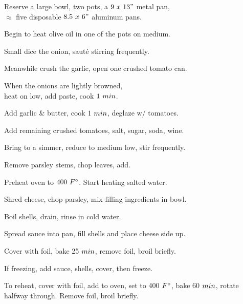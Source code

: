 \begin{preparation}
\item Reserve a large bowl, two pots, a $9~x~13"$ metal pan,\\
	$\approx$ five disposable $8.5~x~6"$ aluminum pans.
\item Begin to heat olive oil in one of the pots on medium.
\item Small dice the onion, saut\'{e} stirring frequently.
\item Meanwhile crush the garlic, open one crushed tomato can.
\item When the onions are lightly browned,\\
	heat on low, add paste, cook $1~\minute$.
\item Add garlic \& butter, cook $1~\minute$, deglaze w/ tomatoes.
\item Add remaining crushed tomatoes, salt, sugar, soda, wine.
\item Bring to a simmer, reduce to medium low, stir frequently.
\item Remove parsley stems, chop leaves, add.
\item Preheat oven to $400~\Fahrenheit$.
	Start heating salted water.
\item Shred cheese, chop parsley, mix filling ingredients in bowl.
\item Boil shells, drain, rinse in cold water.
\item Spread sauce into pan, fill shells and place cheese side up.
\item Cover with foil, bake 25 $\minute$, remove foil, broil briefly.
\item If freezing, add sauce, shells, cover, then freeze.
\item To reheat, cover with foil, add to oven, set to 400 $\Fahrenheit$, bake 60 $\minute$, rotate halfway through. Remove foil, broil briefly.
\end{preparation}


\recipeend%
